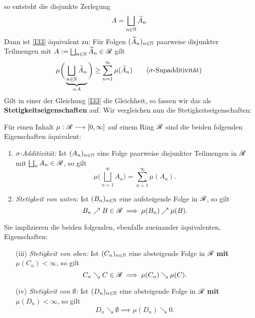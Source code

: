 so entsteht die disjunkte Zerlegung
\begin{equation*}
	A = \bigsqcup_{n\in \mathbb{N}} \widetilde{A}_n
\end{equation*}
Dann ist \eqref{I33} äquivalent zu: Für Folgen $(\widetilde{A}_n)_{n \in \mathbb{N}}$ paarweise disjunkter Teilmengen mit $A:=\bigsqcup_{n\in\mathbb{N}}\widetilde{A}_n \in \mathscr{R}$ gilt
\begin{equation*}
\mu\bigg( \underbrace{\bigsqcup_{n\in \mathbb{N}} \widetilde{A}_n}_{=A} \bigg) \geq \sum_{n=1}^\infty \mu(\widetilde{A}_n)
\tag{$\sigma$-Supadditivität}
\end{equation*}
Gilt in einer der Gleichung \eqref{I33} die Gleichheit, so fassen wir das als \textbf{Stetigkeitseigenschaften} auf. Wir vergleichen nun die Stetigkeitseigenschaften:

\begin{proposition}
\begin{mdframed}
Für einen Inhalt $\mu : \mathscr{R} \longrightarrow [0,\infty]$ auf einem Ring $\mathscr{R}$ sind die beiden folgenden Eigenschaften äquivalent:
\begin{enumerate}[(\roman*),topsep=5pt, itemsep = 0 pt]
	\item \emph{$\sigma$-Additivität:} Ist $(A_n)_{n \in \mathbb{N}}$ eine Folge paarweise disjunkter Teilmengen in $\mathscr{R}$ mit $\bigsqcup_nA_n \in \mathscr{R}$, so gilt
	$$
	\mu \bigg(\bigsqcup_{n=1}^\infty A_n \bigg) = \sum_{n=1}^\infty \mu (A_n).
	$$
	\item \textit{Stetigkeit von unten:} Ist $(B_n)_{n\in\mathbb{N}}$ eine aufsteigende Folge in $\mathscr{R}$, so gilt %
	$$
	B_n \nearrow B \in \mathscr{R} \implies \mu (B_n) \nearrow \mu (B).
	$$
\end{enumerate}
	Sie implizieren die beiden folgenden, ebenfalls zueinander äquivalenten, Eigenschaften:
	\begin{enumerate}[(\roman*),topsep=5pt, itemsep = 0 pt]
	\item[(iii)] \emph{Stetigkeit von oben:} Ist $(C_n)_{n \in \mathbb{N}}$ eine absteigende Folge in $\mathscr{R}$ \textbf{mit} $\mu(C_n) < \infty$, so gilt
	$$C_n \searrow C \in \mathscr{R} \implies \mu (C_n) \searrow \mu (C).$$
	\item[(iv)] \emph{Stetigkeit von $\emptyset$:} Ist $(D_n)_{n \in \mathbb{N}}$ eine absteigende Folge in $\mathscr{R}$ \textbf{mit} $\mu(D_n)<\infty$, so gilt
	$$D_n \searrow \emptyset \implies \mu (D_n) \searrow 0.$$

\end{enumerate}
\end{mdframed}
\end{proposition}
